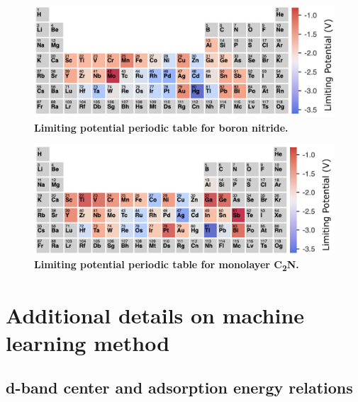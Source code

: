 \documentclass[a4paper, 12pt]{article}
\begin{document}
\begin{figure}[htbp]
  \centering
  \includegraphics[width=\textwidth]{supp_fig16_BN_ptable.png}
  \caption{\textbf{Limiting potential periodic table for boron nitride.}}
  \label{supp_fig16:BN_ptable}
\end{figure}

\begin{figure}[htbp]
  \centering
  \includegraphics[width=\textwidth]{supp_fig17_C2N_ptable.png}
  \caption{\textbf{Limiting potential periodic table for monolayer C\textsubscript{2}N.}}
  \label{supp_fig17:C2N_ptable}
\end{figure}

\newpage

\section{Additional details on machine learning method}

\subsection{d-band center and adsorption energy relations}
\label{supp_sec3.1_dband_eads}
\end{document}
